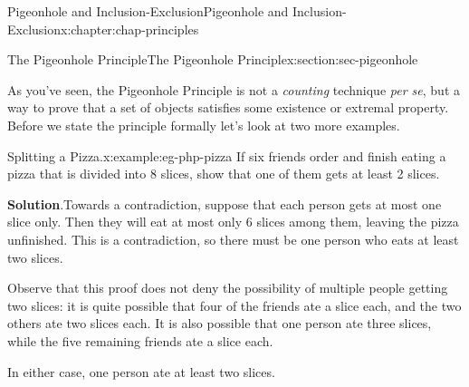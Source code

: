 \documentclass[oneside,10pt,]{book}
\newcommand{\blocktitlefont}{\relax}
\numberwithin{equation}{section}
\begin{document}
\begin{chapterptx}{Pigeonhole and Inclusion-Exclusion}{}{Pigeonhole and Inclusion-Exclusion}{}{}{x:chapter:chap-principles}
\begin{sectionptx}{The Pigeonhole Principle}{}{The Pigeonhole Principle}{}{}{x:section:sec-pigeonhole}
\par
As you've seen, the Pigeonhole Principle is not a \emph{counting} technique \emph{per se}, but a way to prove that a set of objects satisfies some existence or extremal property. Before we state the principle formally let's look at two more examples.%
\begin{example}{Splitting a Pizza.}{x:example:eg-php-pizza}%
If six friends order and finish eating a pizza that is divided into 8 slices, show that one of them gets at least 2 slices.%
\par\smallskip%
\noindent\textbf{\blocktitlefont Solution}.\hypertarget{g:solution:id445230}{}\quad{}Towards a contradiction, suppose that each person gets at most one slice only. Then they will eat at most only 6 slices among them, leaving the pizza unfinished. This is a contradiction, so there must be one person who eats at least two slices.%
\par
Observe that this proof does not deny the possibility of multiple people getting two slices: it is quite possible that four of the friends ate a slice each, and the two others ate two slices each. It is also possible that one person ate three slices, while the five remaining friends ate a slice each.%
\par
In either case, one person ate at least two slices.%
\end{example}
%
\begin{sidebyside}{1}{0.325}{0.325}{0}%
\begin{sbspanel}{0.35}%
%
\end{sbspanel}%

\end{sidebyside}
\end{sectionptx}
\end{chapterptx}
\end{document}
